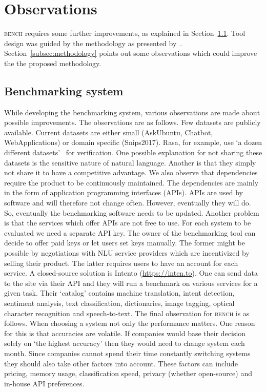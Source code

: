 \section{Observations}
\label{sec:observations}

\textsc{bench} requires some further improvements, as explained in Section~\ref{subsec:benchmarking_system}.
Tool design was guided by the methodology as presented by~\citet{braun2017}.
Section~\ref{subsec:methodology} points out some observations which could improve the the proposed methodology.

\subsection{Benchmarking system}
\label{subsec:benchmarking_system}
While developing the benchmarking system, various observations are made about possible improvements.
The observations are as follows.
Few datasets are publicly available.
Current datasets are either small (AskUbuntu, Chatbot, WebApplications) or domain specific (Snips2017).
Rasa, for example, use `a dozen different datasets'~\citep{nichol2018vectors} for verification.
One possible explanation for not sharing these datasets is the sensitive nature of natural language.
Another is that they simply not share it to have a competitive advantage.
We also observe that dependencies require the product to be continuously maintained.
The dependencies are mainly in the form of application programming interfaces (APIs).
APIs are used by software and will therefore not change often.
However, eventually they will do.
So, eventually the benchmarking software needs to be updated.
Another problem is that the services which offer APIs are not free to use.
For each system to be evaluated we need a separate API key.
The owner of the benchmarking tool can decide to offer paid keys or let users set keys manually.
The former might be possible by negotiations with NLU service providers which are incentivized by selling their product.
The latter requires users to have an account for each service.
A closed-source solution is Intento (\url{https://inten.to}).
One can send data to the site via their API and they will run a benchmark on various services for a given task.
Their `catalog' contains machine translation, intent detection, sentiment analysis, text classification, dictionaries, image tagging, optical character recognition and speech-to-text.
The final observation for \textsc{bench} is as follows.
When choosing a system not only the performance matters.
One reason for this is that accuracies are volatile.
If companies would base their decision solely on `the highest accuracy' then they would need to change system each month.
Since companies cannot spend their time constantly switching systems they should also take other factors into account.
These factors can include pricing, memory usage, classification speed, privacy (whether open-source) and in-house API preferences.


